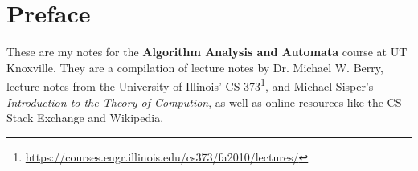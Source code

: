 \chapter*{Preface}
These are my notes for the \textbf{Algorithm Analysis and Automata} course at UT Knoxville. They are a compilation of lecture notes by Dr. Michael W. Berry, lecture notes from the University of Illinois' CS 373\footnote{\url{https://courses.engr.illinois.edu/cs373/fa2010/lectures/}}, and Michael Sisper's \textit{Introduction to the Theory of Compution}, as well as online resources like the CS Stack Exchange and Wikipedia.
